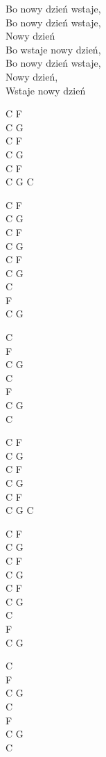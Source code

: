 \begin{text}
    \vin Bo nowy dzień wstaje,\\ 
    \vin Bo nowy dzień wstaje,\\ 
    \vin Nowy dzień\\ 
    \vin Bo wstaje nowy dzień,\\ 
    \vin Bo nowy dzień wstaje,\\ 
    \vin Nowy dzień,\\ 
    \vin Wstaje nowy dzień
\end{text}
\begin{chord}
    C F\\
    C G\\
    C F\\
    C G\\
    C F\\
    C G C

    C F\\
    C G\\
    C F\\
    C G\\
    C F\\
    C G\\
    C\\
    F\\
    C G

    C\\
    F\\ 
    C G\\
    C\\
    F\\
    C G\\
    C

    C F\\
    C G\\
    C F\\
    C G\\
    C F\\
    C G C

    C F\\
    C G\\
    C F\\
    C G\\
    C F\\
    C G\\
    C\\
    F\\
    C G

    C\\
    F\\
    C G\\
    C\\
    F\\
    C G\\
    C
\end{chord}
